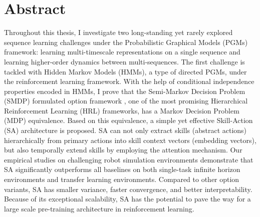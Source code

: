
\chapter*{Abstract}
\label{cha:abstract}

Throughout this thesis, I investigate two long-standing yet
rarely explored sequence learning challenges under the
Probabilistic Graphical Models (PGMs) framework: learning
multi-timescale representations on a single sequence and learning
higher-order dynamics between multi-sequences. The first
challenge is tackled with Hidden Markov Models (HMMs), a type of
directed PGMs, under the reinforcement learning framework. With
the help of conditional independence properties encoded in HMMs,
I prove that the Semi-Markov Decision Problem (SMDP) formulated
option framework
\cite{sutton1999between,bacon2017option,zhang2019dac}, one of the
most promising Hierarchical Reinforcement Learning (HRL)
frameworks, has a Markov Decision Problem (MDP) equivalence.
Based on this equivalence, a simple yet effective Skill-Action
(SA) architecture is proposed. SA can not only extract skills
(abstract actions) hierarchically from primary actions into skill
context vectors (embedding vectors), but also temporally extend
skills by employing the attention mechanism. Our empirical
studies on challenging robot simulation environments demonstrate
that SA significantly outperforms all baselines on both
single-task infinite horizon environments and transfer learning
environments. Compared to other option variants, SA has smaller
variance, faster convergence, and better interpretability.
Because of its exceptional scalability, SA has the potential to
pave the way for a large scale pre-training architecture in
reinforcement learning.

